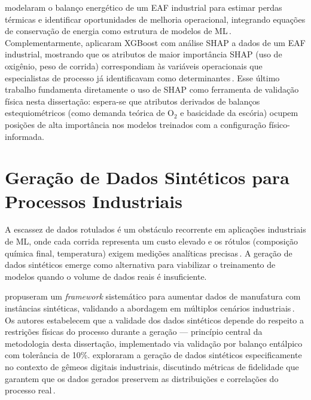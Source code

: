 \citeauthor{logar2022eaf} modelaram o balanço energético de um EAF industrial para estimar perdas térmicas e identificar oportunidades de melhoria operacional, integrando equações de conservação de energia como estrutura de modelos de ML\,\cite{logar2022eaf}. Complementarmente, \citeauthor{manojlovic2022eaf} aplicaram XGBoost com análise SHAP a dados de um EAF industrial, mostrando que os atributos de maior importância SHAP (uso de oxigênio, peso de corrida) correspondiam às variáveis operacionais que especialistas de processo já identificavam como determinantes\,\cite{manojlovic2022eaf}. Esse último trabalho fundamenta diretamente o uso de SHAP como ferramenta de validação física nesta dissertação: espera-se que atributos derivados de balanços estequiométricos (como demanda teórica de O$_2$ e basicidade da escória) ocupem posições de alta importância nos modelos treinados com a configuração físico-informada.

\section{Geração de Dados Sintéticos para Processos Industriais}
\label{sec:dados-sinteticos}

A escassez de dados rotulados é um obstáculo recorrente em aplicações industriais de ML, onde cada corrida representa um custo elevado e os rótulos (composição química final, temperatura) exigem medições analíticas precisas\,\cite{buggineni2024synthetic}. A geração de dados sintéticos emerge como alternativa para viabilizar o treinamento de modelos quando o volume de dados reais é insuficiente.

\citeauthor{buggineni2024synthetic} propuseram um \textit{framework} sistemático para aumentar dados de manufatura com instâncias sintéticas, validando a abordagem em múltiplos cenários industriais\,\cite{buggineni2024synthetic}. Os autores estabelecem que a validade dos dados sintéticos depende do respeito a restrições físicas do processo durante a geração — princípio central da metodologia desta dissertação, implementado via validação por balanço entálpico com tolerância de 10\%. \citeauthor{melo2024synthetic} exploraram a geração de dados sintéticos especificamente no contexto de gêmeos digitais industriais, discutindo métricas de fidelidade que garantem que os dados gerados preservem as distribuições e correlações do processo real\,\cite{melo2024synthetic}.

